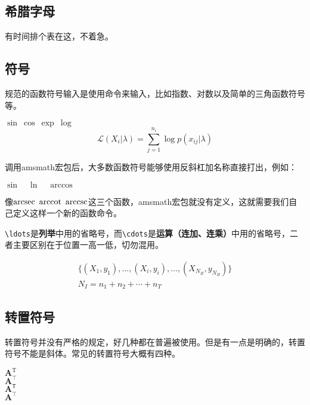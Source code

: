 \subsection{希腊字母}
有时间排个表在这，不着急。

\subsection{符号}
规范的函数符号输入是使用命令来输入，比如指数、对数以及简单的三角函数符号等。

\begin{codeshow}
$ \sin~\cos~\exp~\log $\\
\[\mathcal{L}(X_i|\lambda) = \sum\limits_{j=1}^{n_i}\log p(x_{ij}|\lambda) \]
\end{codeshow}

调用amsmath宏包后，大多数函数符号能够使用反斜杠加名称直接打出，例如：

\begin{codeshow}
$ \sin \quad \ln \quad \arccos $
\end{codeshow}

像$ \arcsec~\arccot~\arccsc $这三个函数，amsmath宏包就没有定义，这就需要我们自己定义这样一个新的函数命令。
\begin{latex}
\DeclareMathOperator{\arcsec}{arcsec}
\DeclareMathOperator{\arccot}{arccot}
\DeclareMathOperator{\arccsc}{arccsc}
\end{latex}


\lstinline|\ldots|是\textbf{列举}中用的省略号，而\lstinline|\cdots|是\textbf{运算（连加、连乘）}中用的省略号，二者主要区别在于位置一高一低，切勿混用。

\begin{codeshow}
\begin{gather*}
\{ (X_1,y_1), \ldots, (X_i,y_i), \ldots, (X_{N_{B}},y_{N_{B}}) \}\\
N_I=n_1 +n_2 + \cdots +n_T
\end{gather*}
\end{codeshow}

\subsection{转置符号}
转置符号并没有严格的规定，好几种都在普遍被使用。但是有一点是明确的，转置符号不能是斜体。常见的转置符号大概有四种。

\begin{codeshow}
$\mathbf{A}^\mathrm{T}$\\
$\mathbf{A}^\top$\\
$\mathbf{A}^\mathsf{T}$\\
$\mathbf{A}^\intercal$
\end{codeshow}

